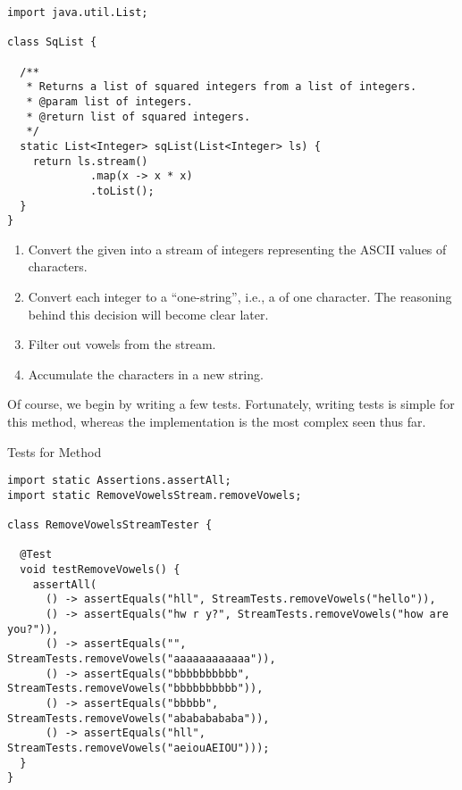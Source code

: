 \begin{cl}[]{}
\begin{lstlisting}[language=MyJava]
import java.util.List;

class SqList {

  /**
   * Returns a list of squared integers from a list of integers.
   * @param list of integers.
   * @return list of squared integers.
   */
  static List<Integer> sqList(List<Integer> ls) {
    return ls.stream()
             .map(x -> x * x)
             .toList();
  }
}
\end{lstlisting}    
\end{cl}


\begin{enumerate}
    \item Convert the given  into a stream of integers representing the ASCII values of characters.
    \item Convert each integer to a ``one-string'', i.e., a  of one character. The reasoning behind this decision will become clear later.
    \item Filter out vowels from the stream.
    \item Accumulate the characters in a new string.
\end{enumerate}

Of course, we begin by writing a few tests. Fortunately, writing tests is simple for this method, whereas the implementation is the most complex seen thus far.

\begin{cl}[]{Tests for  Method}
\begin{lstlisting}[language=MyJava]
import static Assertions.assertAll;
import static RemoveVowelsStream.removeVowels;

class RemoveVowelsStreamTester {
  
  @Test
  void testRemoveVowels() {
    assertAll(
      () -> assertEquals("hll", StreamTests.removeVowels("hello")),
      () -> assertEquals("hw r y?", StreamTests.removeVowels("how are you?")),
      () -> assertEquals("", StreamTests.removeVowels("aaaaaaaaaaaa")),
      () -> assertEquals("bbbbbbbbbb", StreamTests.removeVowels("bbbbbbbbbb")),
      () -> assertEquals("bbbbb", StreamTests.removeVowels("abababababa")),
      () -> assertEquals("hll", StreamTests.removeVowels("aeiouAEIOU")));
  }
}
\end{lstlisting}
\end{cl}

